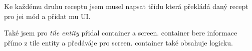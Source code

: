\documentclass[FM,RP]{tulthesis}
\begin{document}
\par    Ke každému druhu receptu jsem musel napsat třídu která překládá daný recept pro jei mód a přidat mu UI.
\par    Také jsem pro \textit{tile entity } přidal container a screen. container bere informace přímo z tile entity a předáváje pro screen. container také obsahuje logicku.
    

\begin{comment}
Při programování sívky jsem začal vytvořením třídy bloku sívky a jeho registrací do registrů. Tato třída odkazuje na \textit{tile entity} a UI kontejner. Dále jsem vytvořil vlastní implementace \textit{forge} rozhraní \textit{IEnergyStorage} a \textit{IFluidTank}. Tyto třídy slouží k ukládání elektřiny a vody. 
\end{comment}
\end{document}
